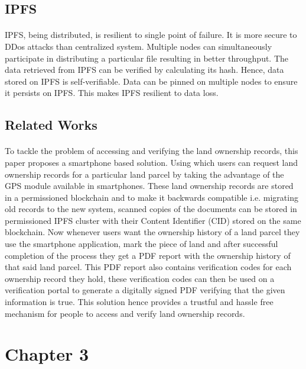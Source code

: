 \documentclass{article}
\begin{document}
    \subsection{IPFS}
        \paragraph{}
        IPFS, being distributed, is resilient to single point of failure. It is more secure to DDos attacks than centralized system. Multiple nodes can simultaneously participate in distributing a particular file resulting in better throughput. The data retrieved from IPFS can be verified by calculating its hash. Hence, data stored on IPFS is self-verifiable. Data can be pinned on multiple nodes to ensure it persists on IPFS. This makes IPFS resilient to data loss.

    \subsection{Related Works}
        \paragraph{}
        To tackle the problem of accessing and verifying the land ownership records, this paper proposes a smartphone based solution. Using which users can request land ownership records for a particular land parcel by taking the advantage of the GPS module available in smartphones. These land ownership records are stored in a permissioned blockchain and to make it backwards compatible i.e. migrating old records to the new system, scanned copies of the documents can be stored in permissioned IPFS cluster with their Content Identifier (CID) stored on the same blockchain. Now whenever users want the ownership history of a land parcel they use the smartphone application, mark the piece of land and after successful completion of the process they get a PDF report with the ownership history of that said land parcel. This PDF report also contains verification codes for each ownership record they hold, these verification codes can then be used on a verification portal to generate a digitally signed PDF verifying that the given information is true. This solution hence provides a trustful and hassle free mechanism for people to access and verify land ownership records.


\section{Chapter 3}
\end{document}
